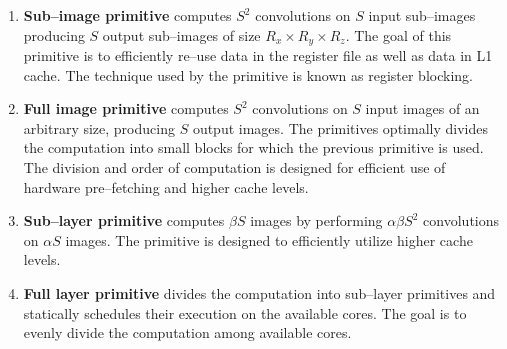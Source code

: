   \begin{enumerate}
  \item {\bf Sub--image primitive} computes $S^2$ convolutions on $S$
    input sub--images producing $S$ output sub--images of size $R_x\times R_y\times R_z$.
    The goal of this primitive is to efficiently re--use data in the
    register file as well as data in L1 cache.  The technique used by
    the primitive is known as register blocking.
  \item {\bf Full image primitive} computes $S^2$ convolutions on $S$
    input images of an arbitrary size, producing $S$ output images.
    The primitives optimally divides the computation into small blocks
    for which the previous primitive is used.  The division and order
    of computation is designed for efficient use of hardware
    pre--fetching and higher cache levels.
  \item {\bf Sub--layer primitive} computes $\beta S$ images by
    performing $\alpha \beta S^2$ convolutions on $\alpha S$ images.
    The primitive is designed to efficiently utilize higher cache
    levels.
  \item {\bf Full layer primitive} divides the computation into
    sub--layer primitives and statically schedules their execution on
    the available cores.  The goal is to evenly divide the computation
    among available cores.
  \end{enumerate}

